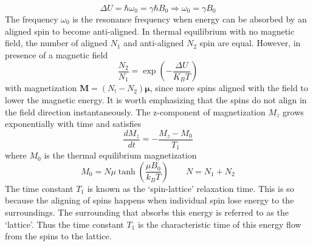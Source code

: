 \documentclass[aps,prb,onecolumn,notitlepage,showpacs,floatfix,superscriptaddress]{revtex4-1}
\begin{document}
\begin{equation}
\Delta U = \hbar \omega_0 = \gamma \hbar B_0 \Rightarrow \omega_0 = \gamma B_0
\end{equation}
The frequency $\omega_0$ is the resonance frequency when energy can be absorbed by an aligned spin to become anti-aligned. In thermal equilibrium with no magnetic field, the number of aligned $N_1$ and anti-aligned $N_2$ spin are equal. However, in presence of a magnetic field
\begin{equation}
\dfrac{N_2}{N_1} = \exp\left( -\dfrac{\Delta U}{K_B T}\right)
\end{equation}
with magnetization ${\bm M} = (N_! -N_2) {\bm \mu}$, since more spins aligned with the field to lower the magnetic energy. It is worth emphasizing that the spins do not align in the field direction instantaneously. The z-component of magnetization $M_z$ grows exponentially with time and satisfies 
\begin{equation}
\dfrac{dM_z}{dt} = -\dfrac{M_z -M_0}{T_1}
\end{equation}
where $M_0$ is the thermal equilibrium magnetization
\begin{equation}
M_0 = N \mu \tanh \left( \dfrac{\mu B_0}{k_B T} \right) \qquad N=N_1 +N_2
\end{equation}
The time constant $T_1$ is known as the `spin-lattice' relaxation time. This is so because the aligning of spins happens when individual spin lose energy to the surroundings. The surrounding that absorbs this energy is referred to as the `lattice'. Thus the time constant $T_1$ is the characteristic time of this energy flow from the spins to the lattice.
\end{document}

